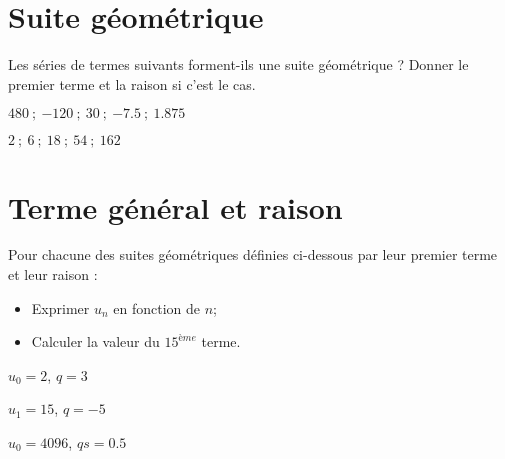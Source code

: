 	\section{Suite géométrique}
	Les séries de termes suivants forment-ils une suite géométrique ? Donner le premier terme et la raison si c'est le cas.
	\begin{questions}
		
	
		\question[2] $\num{480} \: ; \: \num{-120} \: ; \: \num{30}  \: ; \:  \num{-7.5} \: ; \: \num{1.875}$ 
		\fillwithdottedlines{3cm}
		
		\question[2] $\num{2} \: ; \:  \num{6} \: ; \: \num{18} \: ; \: \num{54} \: ; \: \num{162}$%
		\fillwithdottedlines{3cm}
		
	\end{questions}
	
	
\section{Terme général et raison}

Pour chacune des suites géométriques définies ci-dessous par leur premier terme et leur raison :
\begin{itemize}
	\item Exprimer $u_n$ en fonction de $n$;
	\item Calculer la valeur du $15^{ème}$ terme.
\end{itemize} 
\begin{questions}

	
	\question[2] $u_0 = 2$, $q= 3$
	
	\fillwithdottedlines{6cm}
	
	
	\question[2] $u_1 = 15$, $q= -5$
	
	\fillwithdottedlines{6cm}
	
	\question[2] $u_0 = 4096$, $qs=\num{0.5}$
	
	\fillwithdottedlines{6cm}
\end{questions}

